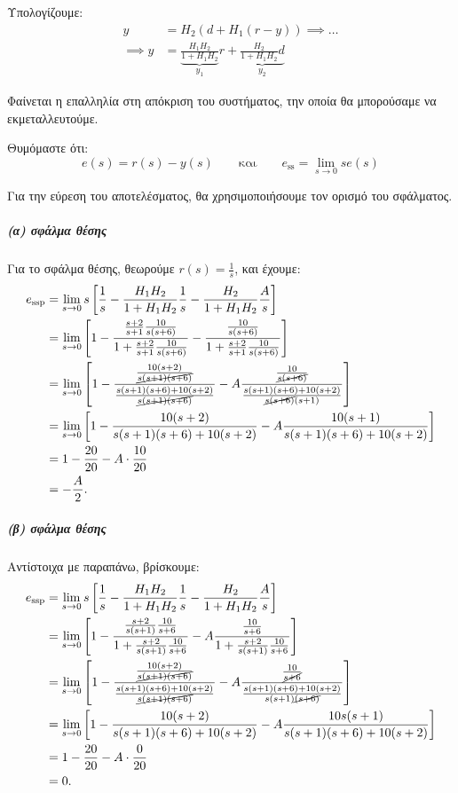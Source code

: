 \documentclass[11pt,a4paper,notitlepage,fleqn]{article}
\begin{document}
\begin{exercise}
Υπολογίζουμε:
\begin{align*}
	y &= H_2\left( d+H_1(r-y) \right) \implies \dots \\
	\implies y &= \underbrace{\frac{H_1H_2}{1+H_1H_2}}_{y_1} r +
	\underbrace{\frac{H_2}{1+H_1H_2}d}_{y_2}
\end{align*}

Φαίνεται η επαλληλία στη απόκριση του συστήματος, την οποία θα μπορούσαμε να εκμεταλλευτούμε.

Θυμόμαστε ότι:
\[
e(s) = r(s)-y(s) \qquad \text{και} \qquad
e_{\mathrm{ss}} = \lim_{s\to 0} se(s)
\]

Για την εύρεση του αποτελέσματος, θα χρησιμοποιήσουμε τον ορισμό του σφάλματος.

\subparagraph{(α) σφάλμα θέσης}
Για το σφάλμα θέσης, θεωρούμε \( r(s) = \frac{1}{s} \),  και έχουμε:
\begin{align*}
	e_{\mathrm{ssp}} &= \lim_{s\to 0}s\left[
	\frac{1}{s} - \frac{H_1H_2}{1+H_1H_2} \frac{1}{s}
	- \frac{H_2}{1+H_1H_2}\frac{A}{s}
	\right]
	\\ &=
	\lim_{s\to 0} \left[
	1 - \frac{\frac{s+2}{s+1}\frac{10}{s(s+6)}}{1+\frac{s+2}{s+1}\frac{10}{s(s+6)}}
	- \frac{\frac{10}{s(s+6)}}{1+\frac{s+2}{s+1}\frac{10}{s(s+6)}}
	\right]
	\\ &= \lim_{s\to 0} \left[
	1-\frac{\frac{10(s+2)}{\cancel{s(s+1)(s+6)}}}{\frac{s(s+1)(s+6)+10(s+2)}{\cancel{s(s+1)(s+6)}}} - A
	\frac{\frac{10}{\cancel{s(s+6)}}}{\frac{s(s+1)(s+6)+10(s+2)}{\cancel{s(s+6)}(s+1)}}
	\right]
	\\ &= \lim_{s\to 0} \left[
	1- \frac{10(s+2)}{s(s+1)(s+6)+10(s+2)}
	-A\frac{10(s+1)}{s(s+1)(s+6)+10(s+2)}
	\right]
	\\ &= 1 - \frac{20}{20} - A\cdot\frac{10}{20}
	\\ &= -\frac{A}{2}.
\end{align*}
\subparagraph{(β) σφάλμα θέσης}
Αντίστοιχα με παραπάνω, βρίσκουμε:
\begin{align*}
    e_{\mathrm{ssp}} &= \lim_{s\to 0}s\left[
    \frac{1}{s} - \frac{H_1H_2}{1+H_1H_2} \frac{1}{s}
    - \frac{H_2}{1+H_1H_2}\frac{A}{s}
    \right]
    \\ &=
    \lim_{s\to 0} \left[
    1 - \frac{\frac{s+2}{s(s+1)}\frac{10}{s+6}}{1+\frac{s+2}{s(s+1)}\frac{10}{s+6}}
    - A\frac{\frac{10}{s+6}}{1+\frac{s+2}{s(s+1)}\frac{10}{s+6}}
    \right]
    \\ &=
    \lim_{s\to 0} \left[
    1-
    \frac{\frac{10(s+2)}{\cancel{s(s+1)(s+6)}}}{\frac{s(s+1)(s+6)+10(s+2)}{\cancel{s(s+1)(s+6)}}}
    - A\frac{\frac{10}{\cancel{s+6}}}{
    	\frac{s(s+1)(s+6)+10(s+2)}{s(s+1)\cancel{(s+6)}}
    	}
    \right]
    \\ &=
    \lim_{s\to 0} \left[
    1 - \frac{10(s+2)}{s(s+1)(s+6)+10(s+2)}
    - A \frac{10s(s+1)}{s(s+1)(s+6)+10(s+2)}
    \right]
    \\ &= 1 - \frac{20}{20} - A\cdot \frac{0}{20}
    \\ &= 0.
\end{align*}


\end{exercise}
\end{document}
